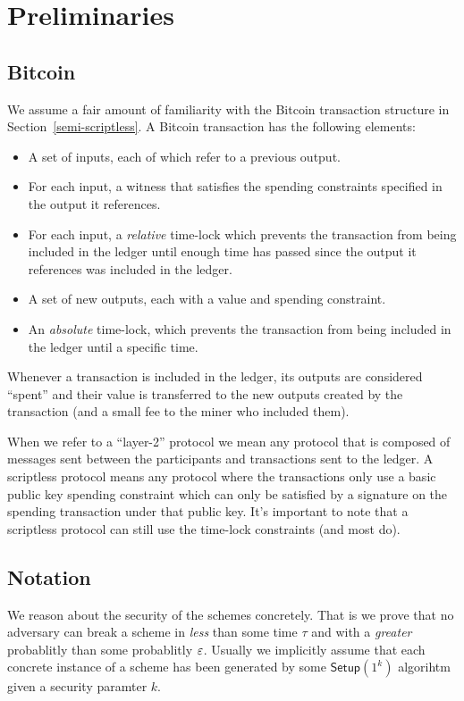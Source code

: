 \section{Preliminaries}

\subsection{Bitcoin}
We assume a fair amount of familiarity with the Bitcoin transaction structure in Section~\ref{semi-scriptless}. A Bitcoin transaction has the following elements:
\begin{itemize}
    \item A set of inputs, each of which refer to a previous output.
    \item For each input, a witness that satisfies the spending constraints specified in the output it references.
    \item For each input, a \emph{relative} time-lock which prevents the transaction from being included in the ledger until enough time has passed since the output it references was included in the ledger.
    \item A set of new outputs, each with a value and spending constraint.
    \item An \emph{absolute} time-lock, which prevents the transaction from being included in the ledger until a specific time.
\end{itemize}
Whenever a transaction is included in the ledger, its outputs are considered ``spent'' and their value is transferred to the new outputs created by the transaction (and a small fee to the miner who included them).

When we refer to a ``layer-2'' protocol we mean any protocol that is composed of messages sent between the participants and transactions sent to the ledger. A scriptless protocol means any protocol where the transactions only use a basic public key spending constraint which can only be satisfied by a signature on the spending transaction under that public key. It's important to note that a scriptless protocol can still use the time-lock constraints (and most do).

\subsection{Notation}

We reason about the security of the schemes concretely.
That is we prove that no adversary can break a scheme in \textit{less} than some time $\tau$ and with a \textit{greater} probablitly than some probablitly $\varepsilon$.
Usually we implicitly assume that each concrete instance of a scheme has been generated by some $\textsf{Setup}(1^k)$ algorihtm given a security paramter $k$.

